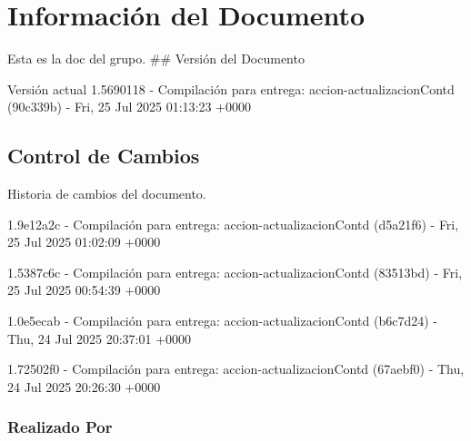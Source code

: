 \documentclass[
	a4paper, %
	12pt, %
]{include/CSSullivanBusinessReport}
\begin{document}
\newpage

\begin{twothirdswidth} %
	\tableofcontents %
\end{twothirdswidth}

\newpage


\newpage

\section{Información del
Documento}\label{sec:informaciuxf3n-del-documento}

Esta es la doc del grupo. \#\# Versión del Documento

\begin{quote}
\end{quote}

Versión actual 1.5690118 - Compilación para entrega:
accion-actualizacionContd (90c339b) - Fri, 25 Jul 2025 01:13:23 +0000

\subsection{Control de Cambios}\label{sec:control-de-cambios}

Historia de cambios del documento.

1.9e12a2c - Compilación para entrega: accion-actualizacionContd
(d5a21f6) - Fri, 25 Jul 2025 01:02:09 +0000

1.5387c6c - Compilación para entrega: accion-actualizacionContd
(83513bd) - Fri, 25 Jul 2025 00:54:39 +0000

1.0e5ecab - Compilación para entrega: accion-actualizacionContd
(b6c7d24) - Thu, 24 Jul 2025 20:37:01 +0000

1.72502f0 - Compilación para entrega: accion-actualizacionContd
(67aebf0) - Thu, 24 Jul 2025 20:26:30 +0000

\subsubsection{Realizado Por}\label{sec:realizado-por}
\end{document}
